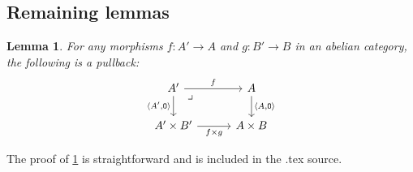 \documentclass[11pt, oneside, article]{memoir}
\theoremstyle{plain}
\newtheorem{lemma}[theorem]{Lemma}
\theoremstyle{definition}
\theoremstyle{remark}
\newcommand{\const}[1]{\mathtt{#1}}%
\DeclarePairedDelimiter{\pair}{\langle}{\rangle}
\newcommand{\zero}{\const{O}}
\newcommand{\hide}[2][]{#1}
\newcommand{\pb}[1][very near start]{\ar[dr, phantom, #1, "\lrcorner"]}
\begin{document}
\subsection{Remaining lemmas}

\begin{lemma}\label{lemma.pullback}
For any morphisms $f\colon A'\to A$ and $g\colon B'\to B$ in an abelian category, the following is a pullback:
\[
\begin{tikzcd}[column sep=30pt]
	A'\ar[r, "f"]\ar[d, "\pair{A',\zero}"']\pb&
	A\ar[d, "\pair{A,\zero}"]\\
	A'\times B'\ar[r, "f\times g"']&
	A\times B
\end{tikzcd}
\]
\end{lemma}
\hide[The proof of \cref{lemma.pullback} is straightforward and is included in the .tex source.]{
\begin{proof}
Consider the following diagram
\[
\begin{tikzcd}[row sep=small]
	A'\ar[dd]\ar[rr, equal]\ar[dr]&&
	A'\ar[dd]\ar[rr, "f"]\ar[dr]&&
	A\ar[dd]\ar[dr]\\&
	0\ar[rr, equal, crossing over]&&
	0\ar[rr, equal, crossing over]&&
	0\ar[dd]\\
	A'\times B'\ar[rr, pos=.25, "A'\times g"]\ar[dr]\ar[dd]&&
	A'\times B\ar[rr, pos=.25, "f\times B"]\ar[dr]\ar[dd]&&
	A\times B\ar[dr]\ar[dd]\\&
	B'\ar[from=uu, crossing over]\ar[rr, crossing over]&&
	B\ar[from=uu, crossing over]\ar[rr, equal, crossing over]&&
	B\ar[dd]\\
	A'\ar[rr, equal]\ar[dr]&&
	A'\ar[rr]\ar[dr]&&
	A\ar[dr]\\&
	0\ar[rr, equal]\ar[from=uu, crossing over]&&
	0\ar[rr, equal]\ar[from=uu, crossing over]&&
	0
\end{tikzcd}
\]
We want to show that the two upper back squares are pullbacks; we will use the pasting lemma for pullbacks. 

In the bottom left-hand cube: the right, left, and bottom faces are clearly pullbacks because 0 is terminal, so the top face is too. In the top left-hand cube: the front, bottom, and top faces are pullbacks, so the back is too. In the bottom right-hand cube: the right, left, and front faces are pullbacks, so the back is too. In the big right-hand rectangle: the right, left, and front are pullbacks, so the back is too. Thus in the top right-hand cube, the back face is a pullback, completing the proof.
\end{proof}
}
\end{document}
